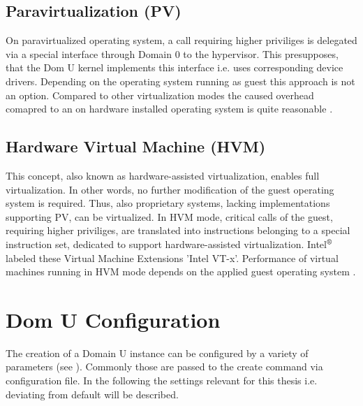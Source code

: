 \subsection{Paravirtualization (PV)}\label{sub:pv}
On paravirtualized operating system, a call requiring higher priviliges is delegated via a special interface through Domain 0 to the hypervisor. This presupposes, that the Dom U kernel implements this interface i.e. uses corresponding device drivers. Depending on the operating system running as guest this approach is not an option. Compared to other virtualization modes the caused overhead comapred to an on hardware installed operating system is quite reasonable \cite{xenprjct}.

\subsection{Hardware Virtual Machine (HVM)}\label{sub:hvm}
This concept, also known as hardware-assisted virtualization, enables full virtualization. In other words, no further modification of the guest operating system is required. Thus, also proprietary systems, lacking implementations supporting PV, can be virtualized. In HVM mode, critical calls of the guest, requiring higher priviliges, are translated into instructions belonging to a special instruction set, dedicated to support hardware-assisted virtualization. Intel$^\text{\textregistered}$ labeled these Virtual Machine Extensions 'Intel VT-x'. Performance of virtual machines running in HVM mode depends on the applied guest operating system \cite{xenprjct}.  


\section{Dom U Configuration}
The creation of a Domain U instance can be configured by a variety of parameters (see \cite{xenxl}). Commonly 
those are passed to the create command via configuration file. In the following the settings relevant for this thesis i.e. deviating from default will be described.

